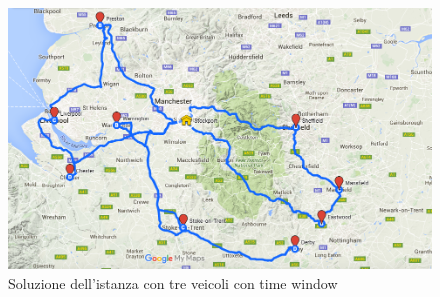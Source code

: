 		\begin{figure}[H]
			\centering
			\includegraphics[keepaspectratio=true, width=14cm]{img/mappa_soluzione_5.png}
			\caption{Soluzione dell'istanza con tre veicoli con time window}
			\label{fig:map_soluzione_5}
		\end{figure}
